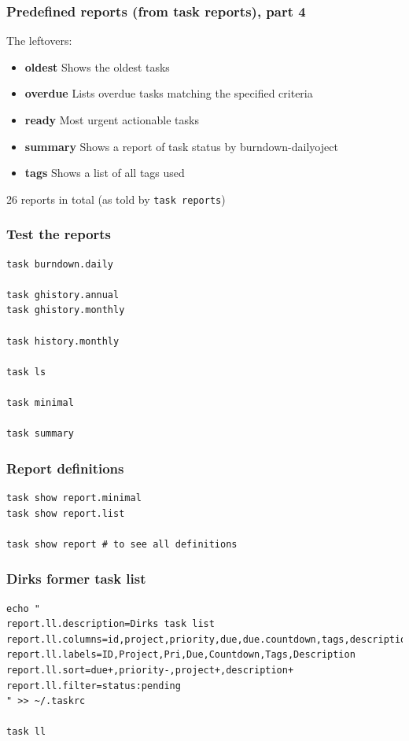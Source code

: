 \documentclass[t,handout]{beamer}
\begin{document}
\begin{frame}[fragile]\frametitle{Predefined reports (from task reports), part 4}
    \vfill
    The leftovers:

    \begin{itemize}
        \item \textbf{oldest}           Shows the oldest tasks
        \item \textbf{overdue}          Lists overdue tasks matching the specified criteria
        \item \textbf{ready}            Most urgent actionable tasks
        \item \textbf{summary}          Shows a report of task status by burndown-dailyoject
        \item \textbf{tags}             Shows a list of all tags used
    \end{itemize}

    26 reports in total (as told by \verb=task reports=)
\end{frame}

\begin{frame}[fragile]\frametitle{Test the reports}
    \vfill
    \begin{lstlisting}
task burndown.daily

task ghistory.annual
task ghistory.monthly

task history.monthly

task ls

task minimal

task summary\end{lstlisting}
\end{frame}

\begin{frame}[fragile]\frametitle{Report definitions}
    \vfill
    \begin{lstlisting}
task show report.minimal
task show report.list

task show report # to see all definitions\end{lstlisting}
\end{frame}

\begin{frame}[fragile]\frametitle{Dirks former task list}
    \vfill
    \begin{lstlisting}
echo "
report.ll.description=Dirks task list
report.ll.columns=id,project,priority,due,due.countdown,tags,description
report.ll.labels=ID,Project,Pri,Due,Countdown,Tags,Description
report.ll.sort=due+,priority-,project+,description+
report.ll.filter=status:pending
" >> ~/.taskrc

task ll\end{lstlisting}
\end{frame}
\end{document}
